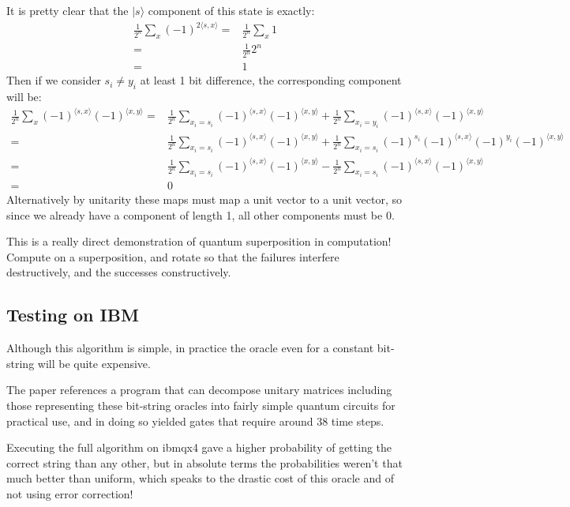 \documentclass[]{article}
\newcommand{\ket}[1]{| #1 \rangle}
\begin{document}
It is pretty clear that the $\ket{s}$ component of this state is exactly:
\begin{align*}
\frac{1}{2^n} \sum_x (-1)^{2\langle s, x\rangle}
=&\frac{1}{2^n} \sum_x 1
\\=& \frac{1}{2^n}2^n
\\=& 1
\end{align*}
Then if we consider $s_i \neq y_i$ at least 1 bit difference, the corresponding component will be:
\begin{align*}
\frac{1}{2^n} \sum_x (-1)^{\langle s, x \rangle}(-1)^{\langle x, y \rangle}
=&\frac{1}{2^n} \sum_{x_i = s_i} (-1)^{\langle s, x \rangle}(-1)^{\langle x, y \rangle} +
\frac{1}{2^n} \sum_{x_i = y_i} (-1)^{\langle s, x \rangle}(-1)^{\langle x, y \rangle}
\\=&\frac{1}{2^n} \sum_{x_i = s_i} (-1)^{\langle s, x \rangle}(-1)^{\langle x, y \rangle} +
\frac{1}{2^n} \sum_{x_i = s_i} (-1)^{s_i}(-1)^{\langle s, x \rangle}(-1)^{y_i}(-1)^{\langle x, y \rangle}
\\=&\frac{1}{2^n} \sum_{x_i = s_i} (-1)^{\langle s, x \rangle}(-1)^{\langle x, y \rangle} -
\frac{1}{2^n} \sum_{x_i = s_i} (-1)^{\langle s, x \rangle}(-1)^{\langle x, y \rangle}
\\=& 0
\end{align*}
Alternatively by unitarity these maps must map a unit vector to a unit vector, so since we already have a component of length 1, all other components must be 0.

This is a really direct demonstration of quantum superposition in computation! Compute on a superposition, and rotate so that the failures interfere destructively, and the successes constructively.

\subsection{Testing on IBM}

Although this algorithm is simple, in practice the oracle even for a constant bit-string will be quite expensive.

The paper references a program that can decompose unitary matrices including those representing these bit-string oracles into fairly simple quantum circuits for practical use, and in doing so yielded gates that require around 38 time steps.

Executing the full algorithm on ibmqx4 gave a higher probability of getting the correct string than any other, but in absolute terms the probabilities weren't that much better than uniform, which speaks to the drastic cost of this oracle and of not using error correction!
\end{document}
